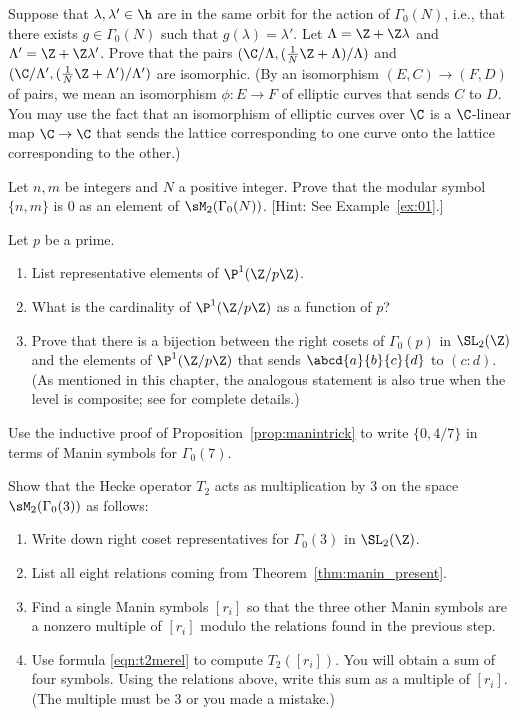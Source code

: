 \begin{exercises}
\item \label{ex:x0n} Suppose that $\lambda, \lambda' \in \h$ are in
the same orbit for the action of $\Gamma_0(N)$, i.e., that there
exists $g\in \Gamma_0(N)$ such that $g(\lambda) = \lambda'$.
Let $\Lambda = \Z + \Z\lambda$ and $\Lambda' = \Z + \Z\lambda'$.
Prove that the pairs $(\C/\Lambda, (\frac{1}{N}\Z+\Lambda)/\Lambda)$
and  $(\C/\Lambda', (\frac{1}{N}\Z + \Lambda')/\Lambda')$ are isomorphic. 
(By an isomorphism $(E,C)\to (F,D)$ of pairs, we mean
an isomorphism $\phi: E\to F$ of elliptic curves that sends
$C$ to $D$.  You may use the fact that an isomorphism of
elliptic curves over $\C$ is a $\C$-linear map $\C\to\C$ that 
sends the lattice corresponding to one curve onto the lattice
corresponding to the other.)

\item \label{ex:modsymzero} 
Let $n,m$ be integers and $N$ a positive integer.
Prove that the modular symbol $\{n,m\}$ is $0$ as an element of 
$\sM_2(\Gamma_0(N))$.  [Hint: See Example~\ref{ex:01}.]

\item \label{ex:bij} Let $p$ be a prime. 
\begin{enumerate}
\item List representative elements of $\P^1(\Z/p\Z)$.
\item What is the cardinality of $\P^1(\Z/p\Z)$ as a function of $p$?
\item Prove that there is a bijection
between the right cosets of $\Gamma_0(p)$ in $\SL_2(\Z)$
and the elements of $\P^1(\Z/p\Z)$ that sends
$\abcd{a}{b}{c}{d}$ to $(c:d)$.
(As mentioned in this chapter, the analogous statement
is also true when the level is composite; 
see \cite[\S2.2]{cremona:algs} for complete details.)
\end{enumerate}

\item \label{ex:intermsofmanin}
Use the inductive proof of Proposition~\ref{prop:manintrick} to
  write $\{0,4/7\}$ in terms of Manin symbols for $\Gamma_0(7)$.

\item \label{ex:heckes2g03}
Show that the Hecke operator $T_2$ acts as multiplication
by $3$ on the space $\sM_2(\Gamma_0(3))$  as follows:
\begin{enumerate}
\item Write down right coset representatives for $\Gamma_0(3)$ in $\SL_2(\Z)$.
\item List all eight relations coming from Theorem~\ref{thm:manin_present}.
\item Find a single Manin symbols $[r_i]$ so that the three other
Manin symbols are a nonzero multiple of $[r_i]$ modulo the relations found
in the previous step.
\item Use formula \eqref{eqn:t2merel} to compute $T_2([r_i])$.  You
  will obtain a sum of four symbols.  Using the relations above, write
  this sum as a multiple of $[r_i]$.  (The multiple must be $3$ or you
  made a mistake.)
\end{enumerate}

\end{exercises}
